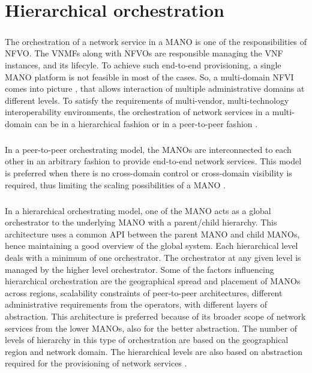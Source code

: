 \chapter{Hierarchical orchestration}
\label{ch:Hierarchical Orchestration}

\paragraph{} The orchestration of a network service in a MANO is one of the responsibilities of NFVO. The VNMFs along with NFVOs are responsible managing the VNF instances, and its lifecyle. To achieve such end-to-end provisioning, a single MANO platform is not feasible in most of the cases. So, a multi-domain NFVI comes into picture , that allows interaction of multiple administrative domains at different levels. To satisfy the requirements of multi-vendor, multi-technology interoperability environments, the orchestration of network services in a multi-domain can be in a hierarchical fashion or in a peer-to-peer fashion \cite{munoz2018hierarchical}.

\paragraph{} In a peer-to-peer orchestrating model, the MANOs are interconnected to each other in an arbitrary fashion to provide end-to-end network services. This model is preferred when
there is no cross-domain control or cross-domain visibility is required, thus limiting the scaling
possibilities of a MANO \cite{munoz2018hierarchical}.


\paragraph{}In a hierarchical orchestrating model, one of the MANO acts as a global orchestrator to the
underlying MANO with a parent/child hierarchy. This architecture uses a common API between
the parent MANO and child MANOs, hence maintaining a good overview of the global system. Each hierarchical level deals with a minimum of one orchestrator. The orchestrator at any given level is managed by the higher level orchestrator. Some of the factors influencing hierarchical orchestration are the geographical spread and placement of MANOs across regions, scalability constraints of peer-to-peer architectures, different administrative requirements from the operators, with different layers of abstraction. This architecture is preferred because of its broader scope of network services from the lower MANOs, also for the better abstraction. The number of levels of hierarchy in this type of orchestration are based on the geographical region and network domain. The hierarchical levels are also based on abstraction required for the provisioning of network services \cite{munoz2018hierarchical}.

